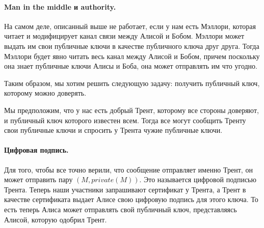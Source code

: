 \documentclass[12pt]{article}
\begin{document}
\paragraph{Man in the middle и authority.} На самом деле, описанный выше не работает, если у нам есть Мэллори, которая читает и модифицирует канал связи между Алисой и Бобом. Мэллори может выдать им свои публичные ключи в качестве публичного ключа друг друга. Тогда Мэллори будет явно читать весь канал между Алисой и Бобом, причем поскольку она знает публичные ключи Алисы и Боба, она может отправлять им что угодно.

Таким образом, мы хотим решить следующую задачу: получить публичный ключ, которому можно доверять.

Мы предположим, что у нас есть добрый Трент, которому все стороны доверяют, и публичный ключ которого известен всем. Тогда все могут сообщить Тренту свои публичные ключи и спросить у Трента чужие публичные ключи.

\paragraph{Цифровая подпись.} Для того, чтобы все точно верили, что сообщение отправляет именно Трент, он может отправить пару $(M, private(M))$. Это называется цифровой подписью Трента. Теперь наши участники запрашивают сертификат у Трента, а Трент в качестве сертификата выдает Алисе свою цифровую подпись для этого ключа. То есть теперь Алиса может отправлять свой публичный ключ, представляясь Алисой, которую одобрил Трент.
\end{document}
